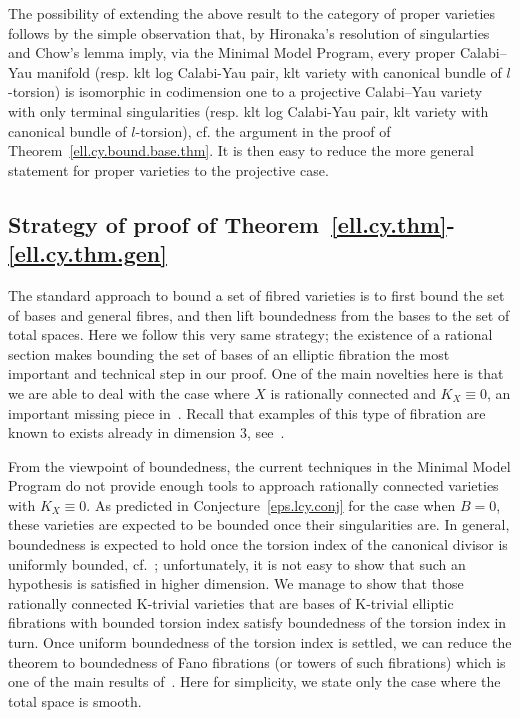 \documentclass[11pt]{ip-journal}
\theoremstyle{definition}
\begin{document}
The possibility of extending the above result to the category of proper varieties follows by the simple observation that, by Hironaka's resolution of singularties and Chow's lemma imply, via the Minimal Model Program, every proper Calabi--Yau manifold (resp. klt log Calabi-Yau pair, klt variety with canonical bundle of $l$-torsion) is isomorphic in codimension one to a projective Calabi--Yau variety with only terminal singularities (resp. klt log Calabi-Yau pair, klt variety with canonical bundle of $l$-torsion), 
cf. the argument in the proof of Theorem~\ref{ell.cy.bound.base.thm}. 
It is then easy to reduce the more general statement for proper varieties to the projective case.

\subsection*{Strategy of proof of Theorem~\ref{ell.cy.thm}-\ref{ell.cy.thm.gen}}

The standard approach to bound a set of fibred varieties is to first bound the set of bases and general fibres, and then lift boundedness from the bases to the set of total spaces. 
Here we follow this very same strategy; the existence of a rational section makes bounding the set of bases of an elliptic fibration the most important and technical step in our proof. 
One of the main novelties here is that we are able to deal with the case where $X$ is rationally connected and $K_X \equiv 0$, an important missing piece in~\cite{DCS}. 
Recall that examples of this type of fibration are known to exists already in dimension $3$, see~\cite{MR1228584}.

From the viewpoint of boundedness, the current techniques in the Minimal Model Program do not provide enough tools to approach rationally connected varieties with $K_X \equiv 0$. 
As predicted in Conjecture~\ref{eps.lcy.conj} for the case when $B=0$, these varieties are expected to be bounded once their singularities are. 
In general, boundedness is expected to hold once the torsion index of the canonical divisor is uniformly bounded, cf.~\cites{CDHJS, 1904.09642}; unfortunately, it is not easy to show that such an hypothesis is satisfied in higher dimension. 
We manage to show that those rationally connected K-trivial varieties that are bases of K-trivial elliptic fibrations with bounded torsion index satisfy boundedness of the torsion index in turn. 
Once uniform boundedness of the torsion index is settled, we can reduce the theorem to boundedness of Fano fibrations (or towers of such fibrations) which is one of the main results of~\cites{1811.10709, 1811.107092}. 
Here for simplicity, we state only the case where the total space is smooth.
\end{document}
